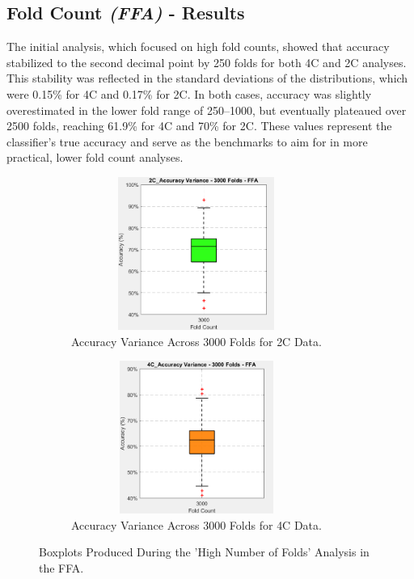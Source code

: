 \subsection{Fold Count \textit{(FFA)} - Results}

The initial analysis, which focused on high fold counts, showed that accuracy stabilized to the second decimal point by 250 folds for both \gls{4C} and \gls{2C} analyses. This stability was reflected in the standard deviations of the distributions, which were 0.15\% for \gls{4C} and 0.17\% for \gls{2C}. In both cases, accuracy was slightly overestimated in the lower fold range of 250–1000, but eventually plateaued over 2500 folds, reaching 61.9\% for \gls{4C} and 70\% for \gls{2C}. These values represent the classifier's true accuracy and serve as the benchmarks to aim for in more practical, lower fold count analyses.

\begin{figure}[htbp]
 	\centering
	\begin{subfigure}{0.49\textwidth}
		\centering
		\includegraphics[width = 0.9\textwidth, height = 5cm]{assets/images/box_2C_3000_ffa.png}
		\caption{Accuracy Variance Across 3000 Folds for \gls{2C} Data.}
		\label{fig:2C_3000_ffa}
	\end{subfigure}
	\hfill
	\begin{subfigure}{0.49\textwidth}
		\centering
	 	\includegraphics[width = 0.9\textwidth, height = 5cm]{assets/images/box_4C_3000_ffa.png}
		\caption{Accuracy Variance Across 3000 Folds for \gls{4C} Data.}
		\label{fig:4C_3000_ffa}
	\end{subfigure}
	\caption[Accuracies Across 3000 Folds Boxplots For The FFA]{Boxplots Produced During the 'High Number of Folds' Analysis in the \gls{FFA}.}
 	\label{fig:fold_HN_ffa}
\end{figure}


